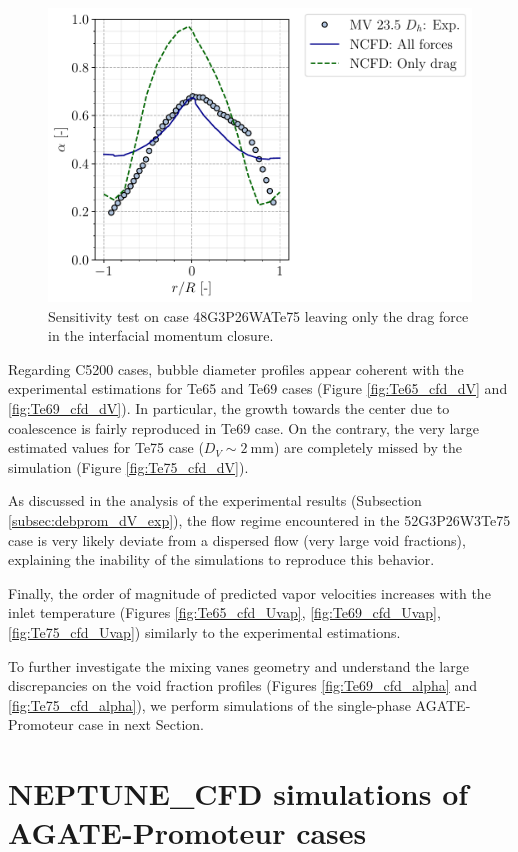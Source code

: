 \begin{figure}[!h]
\centering
\includegraphics[width=0.5\linewidth]{img/DEBORA-Promoteur/cfd/G3P26W23Te75_alpha_drag.pdf}
\caption{Sensitivity test on case 48G3P26WATe75 leaving only the drag force in the interfacial momentum closure.}
\label{fig:prom_onlydrag}
\end{figure}


\npar

Regarding C5200 cases, bubble diameter profiles appear coherent with the experimental estimations for Te65 and Te69 cases (Figure \ref{fig:Te65_cfd_dV} and \ref{fig:Te69_cfd_dV}). In particular, the growth towards the center due to coalescence is fairly reproduced in Te69 case. On the contrary, the very large estimated values for Te75 case ($D_{V} \sim 2\ $mm) are completely missed by the simulation (Figure \ref{fig:Te75_cfd_dV}).

\begin{remark*}{}
As discussed in the analysis of the experimental results (Subsection \ref{subsec:debprom_dV_exp}), the flow regime encountered in the 52G3P26W3Te75 case is very likely deviate from a dispersed flow (very large void fractions), explaining the inability of the simulations to reproduce this behavior.
\end{remark*}


\npar


Finally, the order of magnitude of predicted vapor velocities increases with the inlet temperature (Figures \ref{fig:Te65_cfd_Uvap}, \ref{fig:Te69_cfd_Uvap}, \ref{fig:Te75_cfd_Uvap}) similarly to the experimental estimations.

\npar


To further investigate the mixing vanes geometry and understand the large discrepancies on the void fraction profiles (Figures \ref{fig:Te69_cfd_alpha} and \ref{fig:Te75_cfd_alpha}), we perform simulations of the single-phase AGATE-Promoteur case in next Section.





\section{NEPTUNE\_CFD simulations of AGATE-Promoteur cases}
\label{sec:agate_ncfd}


